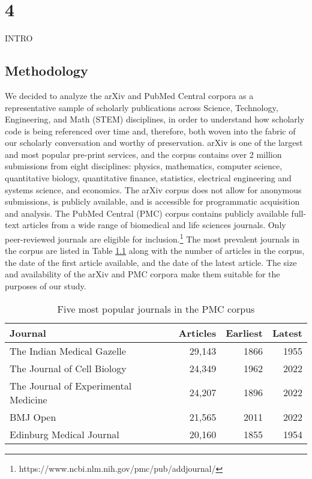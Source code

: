 \chapter{4}
\label{ch:4}


INTRO

\section{Methodology}
We decided to analyze the arXiv and PubMed Central corpora as a representative sample of scholarly publications across Science, Technology, Engineering, and Math (STEM) disciplines, in order to understand how scholarly code is being referenced over time and, therefore, both woven into the fabric of our scholarly conversation and worthy of preservation. arXiv is one of the largest and most popular pre-print services, and the corpus contains over 2 million submissions \cite{fromme-cornell2022} from eight disciplines: physics, mathematics, computer science, quantitative biology, quantitative finance, statistics, electrical engineering and systems science, and economics. The arXiv corpus does not allow for anonymous submissions, is publicly available, and is accessible for programmatic acquisition and analysis. The PubMed Central (PMC) corpus contains publicly available full-text articles from a wide range of biomedical and life sciences journals. Only peer-reviewed journals are eligible for inclusion.\footnote{https://www.ncbi.nlm.nih.gov/pmc/pub/addjournal/} The most prevalent journals in the corpus are listed in Table \ref{tab:pmc_corpus} along with the number of articles in the corpus, the date of the first article available, and the date of the latest article. The size and availability of the arXiv and PMC corpora make them suitable for the purposes of our study.  

\begin{table}
  \centering
  \begin{tabular}{|l|r|r|r|}
    \hline
    Journal & Articles & Earliest & Latest\\
    \hline
    The Indian Medical Gazelle & 29,143 & 1866 & 1955\\
    The Journal of Cell Biology & 24,349 & 1962 & 2022\\
    The Journal of Experimental Medicine & 24,207 & 1896 & 2022\\
    BMJ Open & 21,565 & 2011 & 2022 \\
    Edinburg Medical Journal & 20,160 & 1855 & 1954\\
  \hline
\end{tabular}
\caption{Five most popular journals in the PMC corpus}
\label{tab:pmc_corpus}
\end{table}

